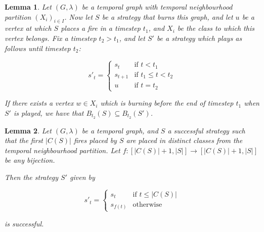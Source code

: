 \documentclass[10pt,a4paper]{amsart}
\newtheorem{lemma}{Lemma}
\begin{document}
\begin{lemma}
    \label{lem:alreadyburn1}
    Let $(G, \lambda)$ be a temporal graph with temporal neighbourhood partition $(X_i)_{i\in I}$. Now let $S$ be a strategy that burns this graph, and let $u$ be a vertex at which $S$ places a fire in a timestep $t_1$, and $X_i$ be the class to which this vertex belongs. Fix a timestep $t_2 > t_1$, and let $S'$ be a strategy which plays as follows until timestep $t_2$:

    \[
    s'_t=\begin{cases}
        s_t&\text{if }t<t_1\\
        s_{t+1}&\text{if }t_1\leq t < t_2\\
        u&\text{if }t=t_2
    \end{cases}
    \]

    If there exists a vertex $w \in X_i$ which is burning before the end of timestep $t_1$ when $S'$ is played, we have that $B_{t_2}(S) \subseteq B_{t_2}(S')$.
\end{lemma}

\begin{lemma}
    \label{lem:arbord1}
    Let $(G, \lambda)$ be a temporal graph, and $S$ a successful strategy such that the first $|C(S)|$ fires placed by $S$ are placed in distinct classes from the temporal neighbourhood partition. Let $f : [|C(S)|+1,|S|] \to [|C(S)|+1,|S|]$ be any bijection.

   Then the strategy $S'$ given by

    \[s'_t=\begin{cases}
        s_t&\text{if }t\leq|C(S)|\\
        s_{f(t)}&\text{otherwise}
    \end{cases}\]

    is successful.
\end{lemma}
\end{document}
